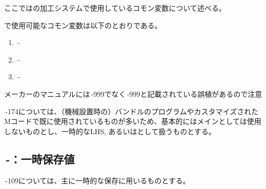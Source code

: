 

ここでは\DMCname の加工システムで使用しているコモン変数について述べる。


\DMCname で使用可能なコモン変数は以下のとおりである。
\begin{enumerate}
\item {}\,-
\item {}\,-
\item {}\,-
\end{enumerate}
\begin{marker}
メーカーのマニュアルには\,-\ttNum999でなく\,-\ttNum999と記載されている誤植があるので注意
\end{marker}



\,-\ttNum174については、（機械設置時の）バンドルのプログラムやカスタマイズされたMコードで既に使用されているものが多いため、基本的にはメインとしては使用しないものとし、一時的なLHS, あるいはとして扱うものとする。


\subsection{\,-：一時保存値}
\noindent{}\,-\ttNum109については、主に一時的な保存に用いるものとする。\\

